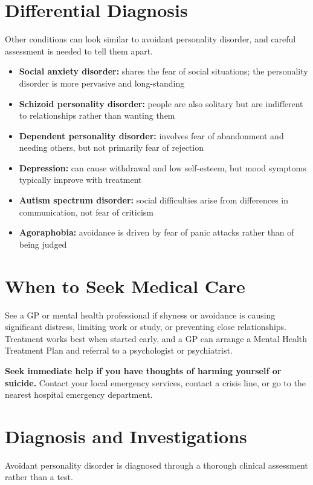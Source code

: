 \section*{Differential Diagnosis}
Other conditions can look similar to avoidant personality disorder, and careful assessment is needed to tell them apart.

\begin{itemize}
    \item \textbf{Social anxiety disorder:} shares the fear of social situations; the personality disorder is more pervasive and long-standing
    \item \textbf{Schizoid personality disorder:} people are also solitary but are indifferent to relationships rather than wanting them
    \item \textbf{Dependent personality disorder:} involves fear of abandonment and needing others, but not primarily fear of rejection
    \item \textbf{Depression:} can cause withdrawal and low self-esteem, but mood symptoms typically improve with treatment
    \item \textbf{Autism spectrum disorder:} social difficulties arise from differences in communication, not fear of criticism
    \item \textbf{Agoraphobia:} avoidance is driven by fear of panic attacks rather than of being judged
\end{itemize}

\section*{When to Seek Medical Care}
See a GP or mental health professional if shyness or avoidance is causing significant distress, limiting work or study, or preventing close relationships. Treatment works best when started early, and a GP can arrange a Mental Health Treatment Plan and referral to a psychologist or psychiatrist.

\textbf{Seek immediate help if you have thoughts of harming yourself or suicide.} Contact your local emergency services, contact a crisis line, or go to the nearest hospital emergency department.

\section*{Diagnosis and Investigations}
Avoidant personality disorder is diagnosed through a thorough clinical assessment rather than a test.

